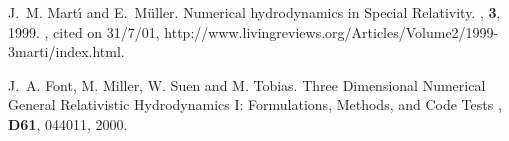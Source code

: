 \documentclass{article}
\begin{document}
\begin{thebibliography}{1}

J.~M. Mart{\'{\i}} and E.~M{\"u}ller.
\newblock Numerical hydrodynamics in {S}pecial {R}elativity.
, {\bf 3}, 1999.
, cited on 31/7/01,
  http://www.livingreviews.org/Articles/Volume2/1999-3marti/index.html.

J.~A. Font, M. Miller, W. Suen and M. Tobias.
\newblock Three Dimensional Numerical General Relativistic
Hydrodynamics I: Formulations, Methods, and Code Tests
, {\bf D61}, 044011, 2000.

\end{thebibliography}

\end{document}
